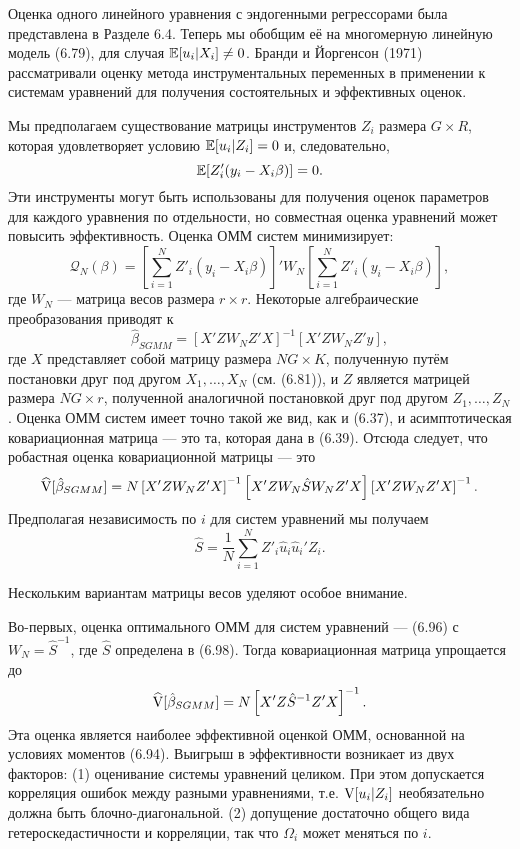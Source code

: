 Оценка одного линейного уравнения с эндогенными регрессорами была представлена в Разделе 6.4. Теперь мы обобщим её на многомерную линейную модель (6.79), для случая $\mathbb{E}[u_i|X_i] \not= 0$. Бранди и Йоргенсон (1971) рассматривали оценку метода инструментальных переменных в применении к системам уравнений для получения состоятельных и эффективных оценок.

Мы предполагаем существование матрицы инструментов $Z_i$ размера $G \times R$, которая удовлетворяет условию $\mathbb{E}[u_i|Z_i] = 0$ и, следовательно,
\begin{equation}
\mathbb{E}[Z'_i(y_i -X_i \beta)]=0.
\end{equation}
Эти инструменты могут быть использованы для получения оценок параметров для каждого уравнения по отдельности, но совместная оценка уравнений может повысить эффективность. Оценка ОММ систем минимизирует:
\begin{equation}
\mathcal{Q}_{N}(\beta)= \left[  \sum_{i=1}^{N} Z'_i(y_i -X_i \beta) \right]' W_N \left[  \sum_{i=1}^{N} Z'_i(y_i -X_i \beta) \right],
\end{equation}
где $W_N$ --- матрица весов размера $r \times r$. Некоторые алгебраические преобразования приводят к
\begin{equation}
\hat{\beta}_{SGMM}=[X' Z W_N Z' X]^{-1} [X' Z W_N Z' y],
\end{equation}
где $X$ представляет собой матрицу размера $NG \times K$, полученную путём постановки друг под другом $X_1, \dots, X_N$ (см. (6.81)), и $Z$ является матрицей размера $NG \times r$, полученной аналогичной постановкой друг под другом $Z_1, \dots, Z_N$. Оценка ОММ систем имеет точно такой же вид, как и (6.37), и асимптотическая ковариационная матрица --- это та, которая дана в (6.39). Отсюда следует, что робастная оценка ковариационной матрицы --- это
\begin{equation}
\widehat{\mathrm{V}}[\hat{\beta}_{SGMM}]= N \left[ X' Z W_N Z' X \right]^{-1} \left[ X' Z W_N \hat{S} W_N Z' X \right] \left[ X' Z W_N Z' X \right]^{-1}.
\end{equation}
Предполагая независимость по $i$ для систем уравнений мы получаем
\begin{equation}
\hat{S}= \frac{1}{N} \sum_{i=1}^{N} Z'_i \hat{u}_i \hat{u}_i' Z_i.
\end{equation}

Нескольким вариантам матрицы весов уделяют особое внимание.

Во-первых, оценка оптимального ОММ для систем уравнений --- (6.96) с $W_N={\hat{S}}^{-1}$, где $\hat{S}$ определена в (6.98). Тогда ковариационная матрица упрощается до
\[
\widehat{\mathrm{V}}[\hat{\beta}_{SGMM}]= N \left[ X' Z  {\hat{S}}^{-1} Z' X \right]^{-1}.
\]
Эта оценка является наиболее эффективной оценкой ОММ, основанной на условиях моментов (6.94). Выигрыш в эффективности возникает из двух факторов: (1) оценивание системы уравнений целиком. При этом допускается корреляция ошибок между разными уравнениями, т.е. $\mathrm{V}[u_i|Z_i]$ необязательно должна быть блочно-диагональной. (2) допущение достаточно общего вида гетероскедастичности и корреляции, так что $\Omega_i$ может меняться по $i$.

